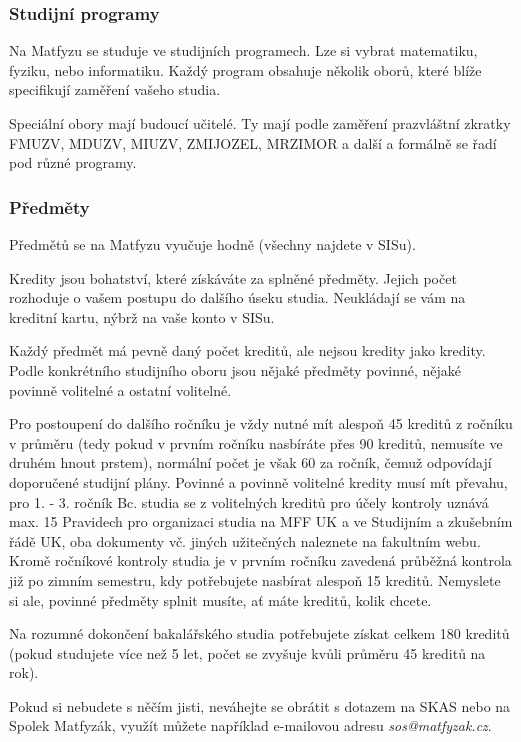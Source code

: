 \subsubsection{Studijní programy}
Na Matfyzu se studuje ve studijních programech. Lze si vybrat
matematiku, fyziku, nebo informatiku. Každý program obsahuje několik oborů, které blíže specifikují zaměření vašeho
studia.

Speciální obory mají budoucí učitelé. Ty mají podle zaměření prazvláštní zkratky FMUZV, MDUZV, MIUZV, ZMIJOZEL, MRZIMOR
a další a formálně se řadí pod různé programy.



\subsubsection{Předměty}
Předmětů se na Matfyzu vyučuje hodně (všechny najdete v SISu).


Kredity jsou bohatství, které získáváte za splněné předměty. Jejich počet rozhoduje o vašem postupu do dalšího úseku
studia. Neukládají se vám na kreditní kartu, nýbrž na vaše konto v SISu.

Každý předmět má pevně daný počet kreditů, ale nejsou kredity jako kredity. Podle konkrétního studijního oboru jsou
nějaké předměty povinné, nějaké povinně volitelné a ostatní volitelné.

Pro postoupení do dalšího ročníku je vždy nutné mít alespoň 45 kreditů z ročníku v průměru (tedy pokud v prvním ročníku
nasbíráte přes 90 kreditů, nemusíte ve druhém hnout prstem), normální počet je však 60 za ročník, čemuž odpovídají
doporučené studijní plány. Povinné a povinně volitelné kredity musí mít převahu, pro 1. - 3. ročník Bc. studia se z
volitelných kreditů pro účely kontroly uznává max. 15 %
Pravidech pro organizaci studia na MFF UK a ve Studijním a zkušebním řádě UK, oba dokumenty vč. jiných užitečných
naleznete na fakultním webu. Kromě ročníkové kontroly studia je v prvním ročníku zavedená průběžná kontrola již po
zimním semestru, kdy potřebujete nasbírat alespoň 15 kreditů. Nemyslete si ale, povinné předměty splnit musíte, ať máte
kreditů, kolik chcete.

Na rozumné dokončení bakalářského studia potřebujete získat celkem 180 kreditů (pokud studujete více než 5 let, počet se
zvyšuje kvůli průměru 45 kreditů na rok).

Pokud si nebudete s něčím jisti, neváhejte se obrátit s dotazem na SKAS nebo na Spolek Matfyzák, využít můžete například
e-mailovou adresu \textit{sos@matfyzak.cz}.




